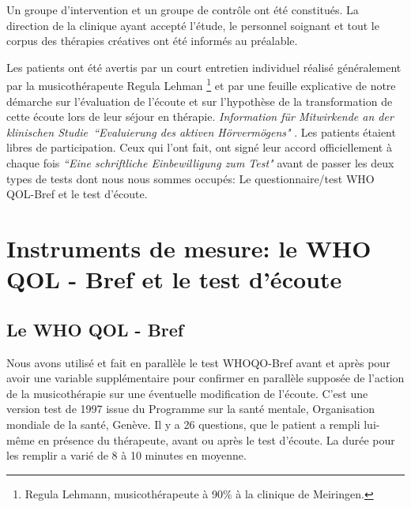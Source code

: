 Un groupe d'intervention et un groupe de contrôle ont été constitués.
La direction de la clinique ayant accepté l'étude, le personnel soignant et tout le
corpus des thérapies créatives ont  été
informés au préalable.

Les patients ont été avertis par un
court entretien individuel réalisé généralement par la musicothérapeute Regula Lehman  \footnote{Regula
  Lehmann, musicothérapeute  à 90\%  à la clinique de Meiringen.} et par  une
feuille explicative de notre démarche sur  l'évaluation de l'écoute et
sur
l'hypothèse de la transformation de cette écoute lors de leur 
séjour en thérapie. \emph{Information für Mitwirkende an der klinischen
  Studie\  ``Evaluierung des aktiven Hörvermögens" }.
Les patients étaient libres de participation. Ceux qui
l'ont fait, ont signé leur accord  officiellement à chaque fois  \emph{``Eine schriftliche Einbewilligung zum
Test"} avant de passer les deux types de tests dont nous nous sommes
occupés: Le questionnaire/test WHO QOL-Bref et le test d'écoute.

 
 
 

\section{Instruments de mesure: le WHO QOL - Bref et le test d'écoute}
 

\subsection{Le WHO QOL - Bref}

Nous avons utilisé et fait en parallèle le test WHOQO-Bref avant et
après pour avoir une variable supplémentaire pour confirmer en
parallèle supposée de l'action de la musicothérapie sur une éventuelle modification de l'écoute.  C'est une
version test de 1997 issue du Programme sur la santé mentale,
Organisation mondiale de la santé, Genève. Il y a 26 questions, que le
patient a rempli lui-même en présence du thérapeute, avant ou après le test
d'écoute. La durée pour les remplir a varié de 8 à 10 minutes en
moyenne. 

